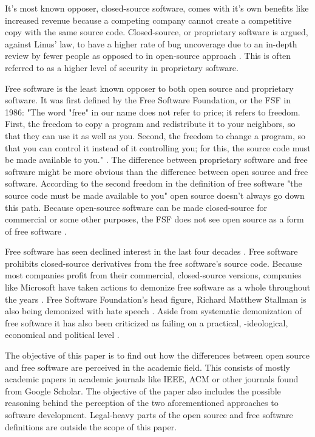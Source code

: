 \documentclass[conference]{IEEEtran}
\begin{document}
It's most known opposer, closed-source software, comes with it's own benefits like increased revenue because a competing company cannot create a competitive copy with the same source code. Closed-source, or proprietary software is argued, against Linus' law, to have a higher rate of bug uncoverage due to an in-depth review by fewer people as opposed to in open-source approach \cite{leblanc2002writing}. This is often referred to as a higher level of security in proprietary software.

Free software is the least known opposer to both open source and proprietary software. It was first defined by the Free Software Foundation, or the FSF in 1986: "The word "free" in our name does not refer to price; it refers to freedom.  First, the freedom to copy a program and redistribute it to your neighbors, so that they can use it as well as you.  Second, the freedom to change a program, so that you can control it instead of it controlling you; for this, the source code must be made available to you." \cite{bull1}. The difference between proprietary software and free software might be more obvious than the difference between open source and free software. According to the second freedom in the definition of free software "the source code must be made available to you" open source doesn't always go down this path. Because open-source software can be made closed-source for commercial or some other purposes, the FSF does not see open source as a form of free software \cite{stallman2002free}.

Free software has seen declined interest in the last four decades \cite{declinewiki}. Free software prohibits closed-source derivatives from the free software's source code. Because most companies profit from their commercial, closed-source versions, companies like Microsoft have taken actions to demonize free software as a whole throughout the years \cite{mundie}. Free Software Foundation's head figure, Richard Matthew Stallman is also being demonized with hate speech \cite{supportrms}. Aside from systematic demonization of free software it has also been criticized as failing on a practical, -ideological, economical and political level \cite{critfree}.

The objective of this paper is to find out how the differences between open source and free software are perceived in the academic field. This consists of mostly academic papers in academic journals like IEEE, ACM or other journals found from Google Scholar. The objective of the paper also includes the possible reasoning behind the perception of the two aforementioned approaches to software development. Legal-heavy parts of the open source and free software definitions are outside the scope of this paper.
\end{document}
